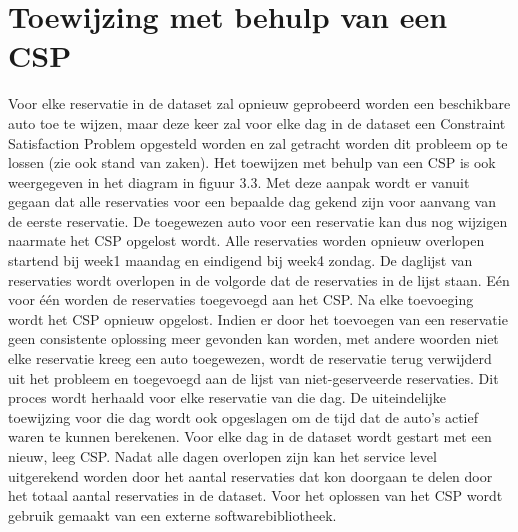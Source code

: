 \section{Toewijzing met behulp van een CSP} \label{csp-toewijzing}
Voor elke reservatie in de dataset zal opnieuw geprobeerd worden een beschikbare auto toe te wijzen, maar deze keer zal voor elke dag in de dataset een Constraint Satisfaction Problem opgesteld worden en zal getracht worden dit probleem op te lossen (zie ook stand van zaken). Het toewijzen met behulp van een CSP is ook weergegeven in het diagram in figuur 3.3. Met deze aanpak wordt er vanuit gegaan dat alle reservaties voor een bepaalde dag gekend zijn voor aanvang van de eerste reservatie. De toegewezen auto voor een reservatie kan dus nog wijzigen naarmate het CSP opgelost wordt. Alle reservaties worden opnieuw overlopen startend bij week1 maandag en eindigend bij week4 zondag. De daglijst van reservaties wordt overlopen in de volgorde dat de reservaties in de lijst staan. Eén voor één worden de reservaties toegevoegd aan het CSP. Na elke toevoeging wordt het CSP opnieuw opgelost. Indien er door het toevoegen van een reservatie geen consistente oplossing meer gevonden kan worden, met andere woorden niet elke reservatie kreeg een auto toegewezen, wordt de reservatie terug verwijderd uit het probleem en toegevoegd aan de lijst van niet-geserveerde reservaties. Dit proces wordt herhaald voor elke reservatie van die dag. De uiteindelijke toewijzing voor die dag wordt ook opgeslagen om de tijd dat de auto's actief waren te kunnen berekenen. Voor elke dag in de dataset wordt gestart met een nieuw, leeg CSP. Nadat alle dagen overlopen zijn kan het service level uitgerekend worden door het aantal reservaties dat kon doorgaan te delen door het totaal aantal reservaties in de dataset. Voor het oplossen van het CSP wordt gebruik gemaakt van een externe softwarebibliotheek.





